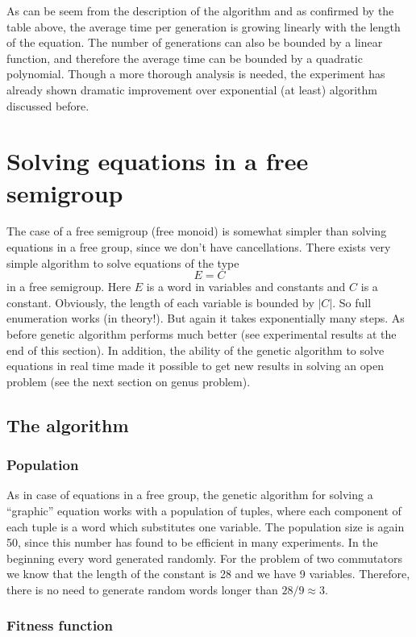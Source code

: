 \documentclass{article}
\begin{document}
As can be seem from the description of the algorithm and as confirmed
by the table above, the average time per generation is growing
linearly with the length of the equation. The number of generations
can also be bounded by a linear function, and therefore the average
time can be bounded by a quadratic polynomial. Though a more thorough
analysis is needed, the experiment has already shown dramatic
improvement over exponential (at least) algorithm discussed before.


\section{Solving equations in a free semigroup}

The case of a free semigroup (free monoid) is somewhat simpler than
solving equations in a free group, since we don't have
cancellations. There exists very simple algorithm to solve equations
of the type 
\[
E = C
\]
in a free semigroup. Here $E$ is a word in variables and constants and
$C$ is a constant. Obviously, the length of each variable is bounded
by $|C|$. So full enumeration works (in theory!). But again it takes
exponentially many steps. As before genetic algorithm performs much
better (see experimental results at the end of this section). In
addition, the ability of the genetic algorithm to solve equations in
real time made it possible to get new results in solving an open
problem (see the next section on genus problem).


  \subsection{The algorithm}

    \subsubsection{Population}

As in case of equations in a free group, the genetic algorithm for
solving a ``graphic'' equation works with a population of tuples,
where each component of each tuple is a word which substitutes one
variable. The population size is again 50, since this number has found
to be efficient in many experiments. In the beginning every word
generated randomly. For the problem of two commutators we know that
the length of the constant is 28 and we have 9 variables. Therefore,
there is no need to generate random words longer than $28/9 \approx
3$.

    \subsubsection{Fitness function}
\end{document}
